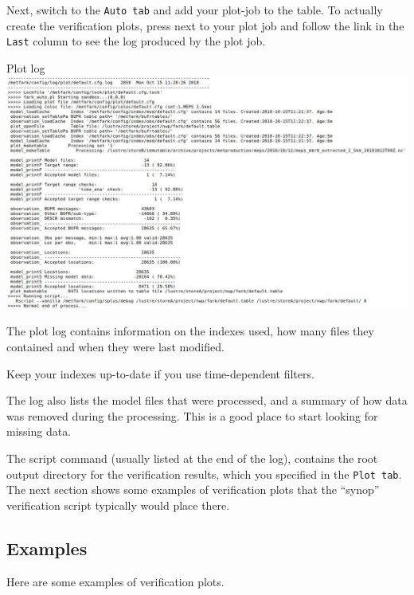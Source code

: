 \documentclass[letterpaper,10pt,twoside,twocolumn,openany]{book}
\begin{document}
{Next, switch to the \lstinline!Auto tab! and add your plot-job to the table.
To actually create the verification plots, press  next to your plot job and follow the link in the \lstinline!Last! column to see the log produced by the plot job.
\begin{paperbox}{Plot log}
  \includegraphics[width=\columnwidth]{plotlog.jpg}
\end{paperbox}

The plot log contains information on the indexes used, how many files they contained and when they were last modified.
\begin{quotebox}
  Keep your indexes up-to-date if you use time-dependent filters.
\end{quotebox}

The log also lists the model files that were processed, and a summary of how data was removed during the processing. This is a good place to start looking for missing data.

The script command (usually listed at the end of the log), contains the root output directory for the verification results, which you specified in the \lstinline!Plot tab!. The next section shows some examples of verification plots that the ``synop'' verification script typically would place there.

\subsection{Examples}
Here are some examples of verification plots.

}
\end{document}
